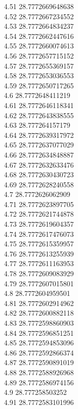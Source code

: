 {4.51	28.7772669648638\\
4.52	28.7772667234552\\
4.53	28.7772664834237\\
4.54	28.7772662447616\\
4.55	28.7772660074613\\
4.56	28.7772657715152\\
4.57	28.7772655369157\\
4.58	28.7772653036553\\
4.59	28.7772650717265\\
4.6	28.7772648411219\\
4.61	28.7772646118341\\
4.62	28.7772643838555\\
4.63	28.777264157179\\
4.64	28.7772639317972\\
4.65	28.7772637077029\\
4.66	28.7772634848887\\
4.67	28.7772632633476\\
4.68	28.7772630430723\\
4.69	28.7772628240558\\
4.7	28.7772626062909\\
4.71	28.7772623897705\\
4.72	28.7772621744878\\
4.73	28.7772619604357\\
4.74	28.7772617476073\\
4.75	28.7772615359957\\
4.76	28.7772613255939\\
4.77	28.7772611163953\\
4.78	28.7772609083929\\
4.79	28.7772607015801\\
4.8	28.7772604959501\\
4.81	28.7772602914962\\
4.82	28.7772600882118\\
4.83	28.7772598860903\\
4.84	28.7772596851251\\
4.85	28.7772594853096\\
4.86	28.7772592866374\\
4.87	28.7772590891019\\
4.88	28.7772588926968\\
4.89	28.7772586974156\\
4.9	28.777258503252\\
4.91	28.7772583101996\\
}
